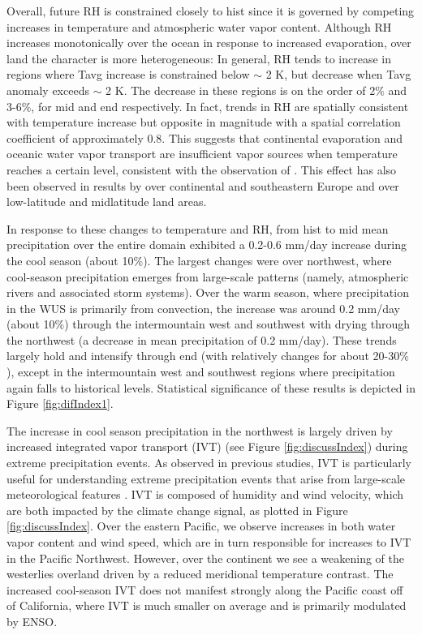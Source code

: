 \documentclass{ametsoc}
\begin{document}
Overall, future RH is constrained closely to {\textsf{hist}} since it is governed by competing increases in temperature and atmospheric water vapor content. Although RH increases monotonically over the ocean in response to increased evaporation, over land the character is more heterogeneous:  In general, RH tends to increase in regions where Tavg increase is constrained below $\sim$ 2 K, but decrease when Tavg anomaly exceeds $\sim$ 2 K. The decrease in these regions is on the order of 2$\%$ and 3-6$\%$, for \textsf{mid} and \textsf{end} respectively.  In fact, trends in RH are spatially consistent with temperature increase but opposite in magnitude with a spatial correlation coefficient of approximately 0.8. This suggests that continental evaporation and oceanic water vapor transport are insufficient vapor sources when temperature reaches a certain level, consistent with the observation of \cite{joshi2008mechanisms}.  This effect has also been observed in results by \cite{rowell2006causes} over continental and southeastern Europe and \cite{simmons2010low} over low-latitude and midlatitude land areas.


In response to these changes to temperature and RH, from \textsf{hist} to \textsf{mid} mean precipitation over the entire domain exhibited a 0.2-0.6 mm/day increase during the cool season (about 10$\%$). The largest changes were over northwest, where cool-season precipitation emerges from large-scale patterns (namely, atmospheric rivers and associated storm systems)\citep{trenberth2003changing, neiman2008meteorological}. Over the warm season, where precipitation in the WUS is primarily from convection, the increase was around 0.2 mm/day (about 10$\%$) through the intermountain west and southwest with drying through the northwest (a decrease in mean precipitation of 0.2 mm/day). These trends largely hold and intensify through \textsf{end} (with relatively changes for about 20-30$\%$), except in the intermountain west and southwest regions where precipitation again falls to historical levels.  Statistical significance of these results is depicted in Figure \ref{fig:difIndex1}.


The increase in cool season precipitation in the northwest is largely driven by increased integrated vapor transport (IVT) (see Figure \ref{fig:discussIndex}) during extreme precipitation events.  As observed in previous studies, IVT is particularly useful for understanding extreme precipitation events that arise from large-scale meteorological features \citep{ralph2004satellite, leung2009atmospheric, dettinger2011climate}.  IVT is composed of humidity and wind velocity, which are both impacted by the climate change signal, as plotted in Figure \ref{fig:discussIndex}. Over the eastern Pacific, we observe increases in both water vapor content and wind speed, which are in turn responsible for increases to IVT in the Pacific Northwest.  However, over the continent we see a weakening of the westerlies overland driven by a reduced meridional temperature contrast.  The increased cool-season IVT does not manifest strongly along the Pacific coast off of California, where IVT is much smaller on average and is primarily modulated by ENSO.
\end{document}
